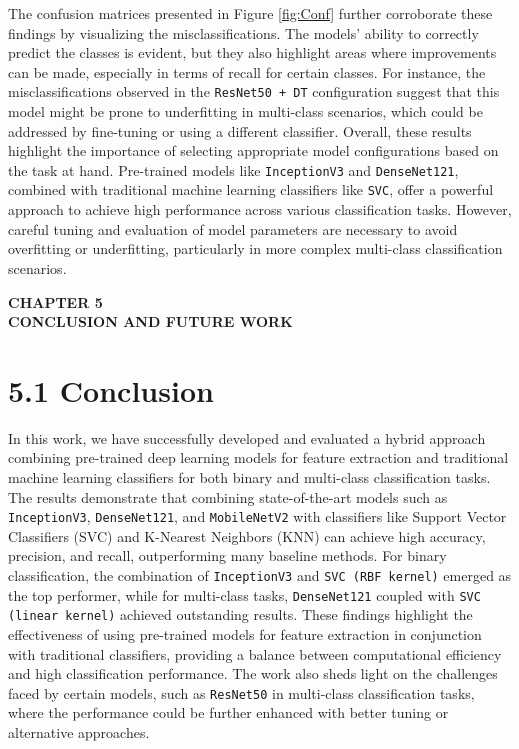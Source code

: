 \documentclass[12pt,a4paper]{report}
\begin{document}
The confusion matrices presented in Figure \ref{fig:Conf} further corroborate these findings by visualizing the misclassifications. The models’ ability to correctly predict the classes is evident, but they also highlight areas where improvements can be made, especially in terms of recall for certain classes. For instance, the misclassifications observed in the \texttt{ResNet50 + DT} configuration suggest that this model might be prone to underfitting in multi-class scenarios, which could be addressed by fine-tuning or using a different classifier. Overall, these results highlight the importance of selecting appropriate model configurations based on the task at hand. Pre-trained models like \texttt{InceptionV3} and \texttt{DenseNet121}, combined with traditional machine learning classifiers like \texttt{SVC}, offer a powerful approach to achieve high performance across various classification tasks. However, careful tuning and evaluation of model parameters are necessary to avoid overfitting or underfitting, particularly in more complex multi-class classification scenarios.
	
	
\newpage
\begin{center}
	\textbf{\Large CHAPTER 5}\\[0.5cm]
	\textbf{\Large CONCLUSION AND FUTURE WORK}
\end{center}

\section*{5.1 Conclusion}

\hspace{1cm}In this work, we have successfully developed and evaluated a hybrid approach combining pre-trained deep learning models for feature extraction and traditional machine learning classifiers for both binary and multi-class classification tasks. The results demonstrate that combining state-of-the-art models such as \texttt{InceptionV3}, \texttt{DenseNet121}, and \texttt{MobileNetV2} with classifiers like Support Vector Classifiers (SVC) and K-Nearest Neighbors (KNN) can achieve high accuracy, precision, and recall, outperforming many baseline methods. For binary classification, the combination of \texttt{InceptionV3} and \texttt{SVC (RBF kernel)} emerged as the top performer, while for multi-class tasks, \texttt{DenseNet121} coupled with \texttt{SVC (linear kernel)} achieved outstanding results. These findings highlight the effectiveness of using pre-trained models for feature extraction in conjunction with traditional classifiers, providing a balance between computational efficiency and high classification performance. The work also sheds light on the challenges faced by certain models, such as \texttt{ResNet50} in multi-class classification tasks, where the performance could be further enhanced with better tuning or alternative approaches.
\end{document}
